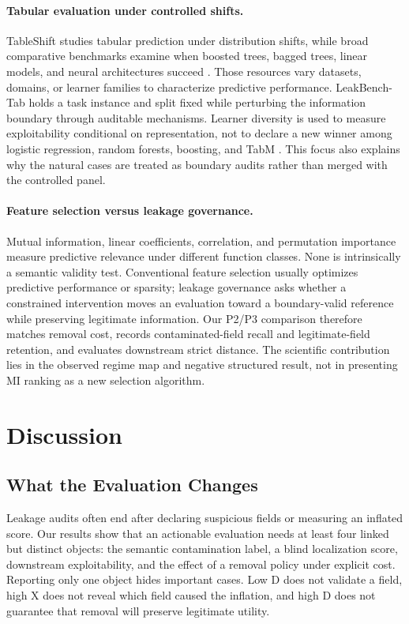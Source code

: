 \documentclass[sigconf,review]{acmart}
\begin{document}
\paragraph{Tabular evaluation under controlled shifts.}
TableShift studies tabular prediction under distribution shifts, while broad
comparative benchmarks examine when boosted trees, bagged trees, linear models,
and neural architectures succeed \cite{gardner2023tableshift,
mcelfresh2023tabzilla,grinsztajn2022trees}. Those resources vary datasets,
domains, or learner families to characterize predictive performance.
LeakBench-Tab holds a task instance and split fixed while perturbing the
information boundary through auditable mechanisms. Learner diversity is used
to measure exploitability conditional on representation, not to declare a new
winner among logistic regression, random forests, boosting, and TabM
\cite{breiman2001random,prokhorenkova2018catboost,ke2017lightgbm,
gorishniy2025tabm}. This focus also explains why the natural cases are treated
as boundary audits rather than merged with the controlled panel.

\paragraph{Feature selection versus leakage governance.}
Mutual information, linear coefficients, correlation, and permutation
importance measure predictive relevance under different function classes.
None is intrinsically a semantic validity test. Conventional feature selection
usually optimizes predictive performance or sparsity; leakage governance asks
whether a constrained intervention moves an evaluation toward a boundary-valid
reference while preserving legitimate information. Our P2/P3 comparison
therefore matches removal cost, records contaminated-field recall and
legitimate-field retention, and evaluates downstream strict distance. The
scientific contribution lies in the observed regime map and negative structured
result, not in presenting MI ranking as a new selection algorithm.

\section{Discussion}

\subsection{What the Evaluation Changes}

Leakage audits often end after declaring suspicious fields or measuring an
inflated score. Our results show that an actionable evaluation needs at least
four linked but distinct objects: the semantic contamination label, a blind
localization score, downstream exploitability, and the effect of a removal
policy under explicit cost. Reporting only one object hides important cases.
Low D does not validate a field, high X does not reveal which field caused the
inflation, and high D does not guarantee that removal will preserve legitimate
utility.
\end{document}
